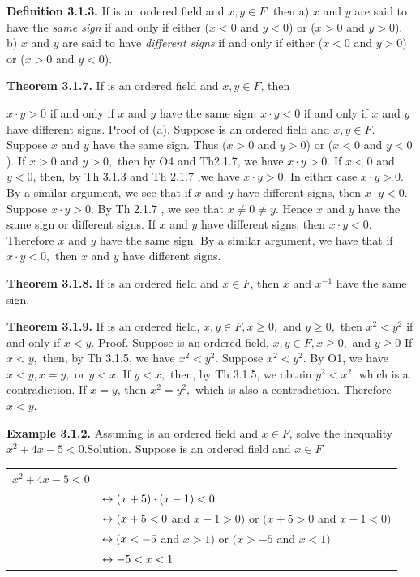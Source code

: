 \begin{large}
\textbf{Definition 3.1.3.} If \of  is an ordered field and $x,y\in F$, then\nl
a) $x$ and $y$ are said to have the \textit{same sign} if and only if either ($x < 0$ and $y < 0$) or ($x > 0$ and
$y > 0$).\nl
b) $x$ and $y$ are said to have \textit{different signs} if and only if either ($x < 0$ and $y > 0$) or ($x > 0$ and $y < 0$).\nl

\textbf{Theorem 3.1.7.} If \of  is an ordered field and $x,y\in F$, then

\newpage

$x\cdot y > 0$ if and only if $x$ and $y$ have the same sign. $x\cdot y < 0$ if and only if $x$ and $y$ have different signs.\nl
 Proof of (a). Suppose \of  is an ordered field and $x,y\in F.$ \nl
\quad Suppose $x$ and $y$ have the same sign. Thus ($x > 0$ and $y > 0$) or ($x < 0$ and $y <0$ ). If $x > 0$ and $y > 0,$ then by O4 and Th2.1.7, we have $x\cdot y > 0.$ If $x < 0$ and $y < 0$, then, by Th 3.1.3 and Th 2.1.7 ,we have $x\cdot y > 0$. In either case $x\cdot y > 0.$\nl
$ $\quad By a similar argument, we see that if $x$ and $y$ have different signs, then $x\cdot y < 0.$\nl
$ $\quad Suppose $x\cdot y > 0.$ By Th 2.1.7 , we see that $x\neq 0 \neq y.$ Hence $x$ and $y$ have the same sign or different signs. If $x$ and $y$ have different signs, then $x\cdot y < 0.$ Therefore $x$ and $y$ have the same sign. \nl
By a similar argument, we have that if $x\cdot y < 0,$ then $x$ and $y$ have different signs. \nl

\textbf{Theorem 3.1.8.} If \of  is an ordered field and $x\in F$, then $x$ and $x^{-1}$ have the same sign. \nl

\textbf{Theorem 3.1.9.} If \of  is an ordered field, $x,y\in F, x \geq 0,$ and $y\geq 0,$ then $x^{2} < y^{2}$ if and only if $x < y.$\nl
 Proof. Suppose \of is an ordered field, $x,y\in F, x \geq 0,$ and $y\geq 0$\nl
If $x < y,$ then, by Th 3.1.5, we have $x^{2} < y^{2}.$\nl
Suppose $x^{2} <y^{2}.$ By O1, we have $x < y, x = y,$ or $y < x.$ If $y < x,$ then, by Th 3.1.5, we obtain $y^{2} < x^{2}$, which is a contradiction. If $x = y$, then $x^{2} = y^{2},$ which is also a contradiction. Therefore $x  < y.$ \nl

\textbf{Example 3.1.2.} Assuming \of is an ordered field and $x\in F$, solve the inequality $x^{2} + 4x - 5< 0.$\nl Solution. Suppose \of is an ordered field and $x\in F$.\nl
\begin{tabular}{l l}
$x^{2} + 4x - 5 < 0$&\\
&$\leftrightarrow (x+5)\cdot(x-1) < 0$\\
&$\leftrightarrow (x+5 <0$ and $x-1>0)$ or $(x+5>0$ and $x-1 < 0)$\\
&$\leftrightarrow (x<-5$ and $x> 1)$ or $(x>-5$ and $x< 1)$\\
&$\leftrightarrow -5<x<1$\\
\end{tabular}\nl


\end{large}
